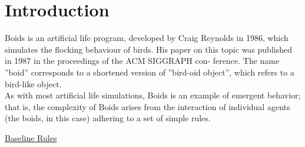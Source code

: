 \documentclass[12pt]{report}
\begin{document}
\vspace{0.2cm}

\newpage

\tableofcontents

\newpage


\chapter{Introduction}

Boids is an artificial life program, developed by Craig Reynolds in 1986,
which simulates the flocking behaviour of birds. His paper on this topic
was published in 1987 in the proceedings of the ACM SIGGRAPH con-
ference. The name ”boid” corresponds to a shortened version of ”bird-oid
object”, which refers to a bird-like object.
\\
As with most artificial life simulations, Boids is an example of emergent
behavior; that is, the complexity of Boids arises from the interaction of individual agents (the boids, in this case) adhering to a set of simple rules.

\hyperref[sec:baseline]{Baseline Rules}

\vspace{0.5cm}
\end{document}

